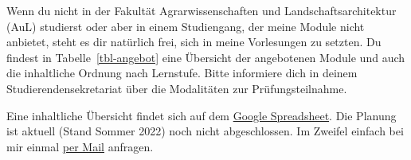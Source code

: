 \documentclass[
  letterpaper,
  DIV=11,
  oneside]{scrreport}
\begin{document}
{}

Wenn du nicht in der Fakultät Agrarwissenschaften und
Landschaftsarchitektur (AuL) studierst oder aber in einem Studiengang,
der meine Module nicht anbietet, steht es dir natürlich frei, sich in
meine Vorlesungen zu setzten. Du findest in Tabelle~\ref{tbl-angebot}
eine Übersicht der angebotenen Module und auch die inhaltliche Ordnung
nach Lernstufe. Bitte informiere dich in deinem Studierendensekretariat
über die Modalitäten zur Prüfungsteilnahme.

Eine inhaltliche Übersicht findet sich auf dem
\href{https://docs.google.com/spreadsheets/d/1WCTnJnofz5OrGZth6LKyPGQvQUUw31t7OfnAE6yz-ww/edit?usp=sharing}{Google
Spreadsheet}. Die Planung ist aktuell (Stand Sommer 2022) noch nicht
abgeschlossen. Im Zweifel einfach bei mir einmal
\protect\hyperlink{sec-contact-mail}{per Mail} anfragen.
\end{document}
